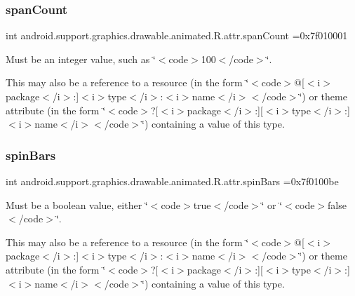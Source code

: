 \subsubsection{\texorpdfstring{span\+Count}{spanCount}}
{\footnotesize\ttfamily int android.\+support.\+graphics.\+drawable.\+animated.\+R.\+attr.\+span\+Count =0x7f010001\hspace{0.3cm}{\ttfamily [static]}}

Must be an integer value, such as \char`\"{}$<$code$>$100$<$/code$>$\char`\"{}. 

This may also be a reference to a resource (in the form \char`\"{}$<$code$>$@\mbox{[}$<$i$>$package$<$/i$>$\+:\mbox{]}$<$i$>$type$<$/i$>$\+:$<$i$>$name$<$/i$>$$<$/code$>$\char`\"{}) or theme attribute (in the form \char`\"{}$<$code$>$?\mbox{[}$<$i$>$package$<$/i$>$\+:\mbox{]}\mbox{[}$<$i$>$type$<$/i$>$\+:\mbox{]}$<$i$>$name$<$/i$>$$<$/code$>$\char`\"{}) containing a value of this type. \mbox{\label{classandroid_1_1support_1_1graphics_1_1drawable_1_1animated_1_1R_1_1attr_a1615810d6366173fb37dc5c1428adc36}} 
\subsubsection{\texorpdfstring{spin\+Bars}{spinBars}}
{\footnotesize\ttfamily int android.\+support.\+graphics.\+drawable.\+animated.\+R.\+attr.\+spin\+Bars =0x7f0100be\hspace{0.3cm}{\ttfamily [static]}}

Must be a boolean value, either \char`\"{}$<$code$>$true$<$/code$>$\char`\"{} or \char`\"{}$<$code$>$false$<$/code$>$\char`\"{}. 

This may also be a reference to a resource (in the form \char`\"{}$<$code$>$@\mbox{[}$<$i$>$package$<$/i$>$\+:\mbox{]}$<$i$>$type$<$/i$>$\+:$<$i$>$name$<$/i$>$$<$/code$>$\char`\"{}) or theme attribute (in the form \char`\"{}$<$code$>$?\mbox{[}$<$i$>$package$<$/i$>$\+:\mbox{]}\mbox{[}$<$i$>$type$<$/i$>$\+:\mbox{]}$<$i$>$name$<$/i$>$$<$/code$>$\char`\"{}) containing a value of this type. \mbox{\label{classandroid_1_1support_1_1graphics_1_1drawable_1_1animated_1_1R_1_1attr_a007a7d728008b624ade8c004ef8174f6}} 
